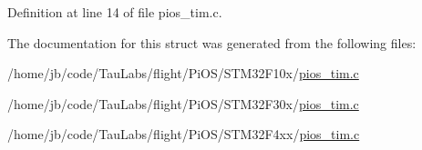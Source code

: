 \-Definition at line 14 of file pios\-\_\-tim.\-c.



\-The documentation for this struct was generated from the following files\-:\begin{DoxyCompactItemize}
\item 
/home/jb/code/\-Tau\-Labs/flight/\-Pi\-O\-S/\-S\-T\-M32\-F10x/\hyperlink{_s_t_m32_f10x_2pios__tim_8c}{pios\-\_\-tim.\-c}\item 
/home/jb/code/\-Tau\-Labs/flight/\-Pi\-O\-S/\-S\-T\-M32\-F30x/\hyperlink{_s_t_m32_f30x_2pios__tim_8c}{pios\-\_\-tim.\-c}\item 
/home/jb/code/\-Tau\-Labs/flight/\-Pi\-O\-S/\-S\-T\-M32\-F4xx/\hyperlink{_s_t_m32_f4xx_2pios__tim_8c}{pios\-\_\-tim.\-c}\end{DoxyCompactItemize}
